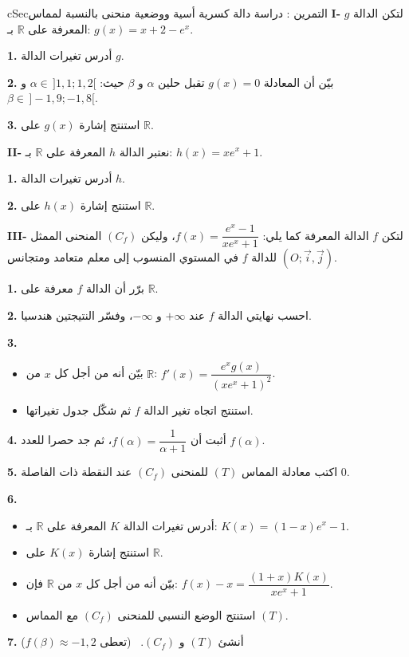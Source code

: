 \documentclass[12pt,a4paper]{article}
\newenvironment{BOX}[2]{\begin{otherlanguage}{english}\begin{arbox}{#1}{#2}}{\end{arbox}\end{otherlanguage}}
\newcounter{exo}
\newenvironment{tamrin}[1]{\stepcounter{exo}\begin{BOX}{cSec}{التمرين \theexo: #1}}{\end{BOX}}
\newcommand{\R}{\mathbb{R}}
\newenvironment{sq}{\begin{itemize}[leftmargin=2.4em,itemsep=3pt]}{\end{itemize}}
\newcommand{\qa}{\item[(أ)]}\newcommand{\qb}{\item[(ب)]}\newcommand{\qc}{\item[(جـ)]}\newcommand{\qd}{\item[(د)]}\newcommand{\qe}{\item[(هـ)]}
\newcommand{\QQ}[1]{\par\smallskip\textbf{#1.} }
\begin{document}
\begin{tamrin}{دراسة دالة كسرية أسية ووضعية منحنى بالنسبة لمماس}
\textbf{I-} لتكن الدالة $g$ المعرفة على $\R$ بـ: $g(x)=x+2-e^{x}$.
\QQ{1} أدرس تغيرات الدالة $g$.
\QQ{2} بيّن أن المعادلة $g(x)=0$ تقبل حلين $\alpha$ و $\beta$ حيث: $\alpha\in\,]1{,}1;1{,}2[$ و $\beta\in\,]-1{,}9;-1{,}8[$.
\QQ{3} استنتج إشارة $g(x)$ على $\R$.

\textbf{II-} نعتبر الدالة $h$ المعرفة على $\R$ بـ: $h(x)=xe^{x}+1$.
\QQ{1} أدرس تغيرات الدالة $h$.
\QQ{2} استنتج إشارة $h(x)$ على $\R$.

\textbf{III-} لتكن $f$ الدالة المعرفة كما يلي: $f(x)=\dfrac{e^{x}-1}{xe^{x}+1}$، وليكن $(C_f)$ المنحنى الممثل للدالة $f$ في المستوي المنسوب إلى معلم متعامد ومتجانس $\left(O;\vec i,\vec j\right)$.
\QQ{1} برّر أن الدالة $f$ معرفة على $\R$.
\QQ{2} احسب نهايتي الدالة $f$ عند $+\infty$ و $-\infty$، وفسّر النتيجتين هندسيا.
\QQ{3} \begin{sq}
\qa بيّن أنه من أجل كل $x$ من $\R$: $f'(x)=\dfrac{e^{x}g(x)}{\left(xe^{x}+1\right)^{2}}$.
\qb استنتج اتجاه تغير الدالة $f$ ثم شكّل جدول تغيراتها.
\end{sq}
\QQ{4} أثبت أن $f(\alpha)=\dfrac{1}{\alpha+1}$، ثم جد حصرا للعدد $f(\alpha)$.
\QQ{5} اكتب معادلة المماس $(T)$ للمنحنى $(C_f)$ عند النقطة ذات الفاصلة $0$.
\QQ{6} \begin{sq}
\qa أدرس تغيرات الدالة $K$ المعرفة على $\R$ بـ: $K(x)=(1-x)e^{x}-1$.
\qb استنتج إشارة $K(x)$ على $\R$.
\qc بيّن أنه من أجل كل $x$ من $\R$ فإن: $f(x)-x=\dfrac{(1+x)K(x)}{xe^{x}+1}$.
\qd استنتج الوضع النسبي للمنحنى $(C_f)$ مع المماس $(T)$.
\end{sq}
\QQ{7} أنشئ $(T)$ و $(C_f)$. \ (تعطى $f(\beta)\approx-1{,}2$)
\end{tamrin}
\end{document}
